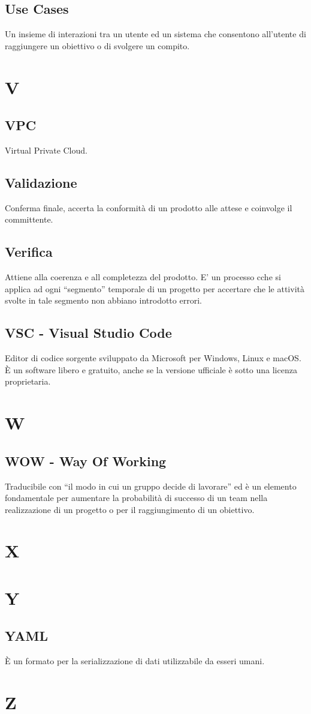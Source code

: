 \documentclass{classes/base}
\begin{document}
        \subsection*{Use Cases} 
        Un insieme di interazioni tra un utente ed un sistema che consentono all'utente di raggiungere un obiettivo o di svolgere un compito.
        
        \newpage  
    \section{V}

        \subsection*{VPC}
        Virtual Private Cloud.

        \subsection*{Validazione} 
        Conferma finale, accerta la conformità di un prodotto alle attese e coinvolge il committente.

        \subsection*{Verifica}
        Attiene alla coerenza e all completezza del prodotto. E’ un processo cche si applica ad ogni “segmento” temporale di un progetto per accertare che le attività svolte in tale segmento non abbiano introdotto errori.

        \subsection*{VSC - Visual Studio Code}
        Editor di codice sorgente sviluppato da Microsoft per Windows, Linux e macOS. È un software libero e gratuito, anche se la versione ufficiale è sotto una licenza proprietaria.

        \newpage  
    \section{W}
        \subsection*{WOW - Way Of Working}
        Traducibile con “il modo in cui un gruppo decide di lavorare” ed è un elemento fondamentale per aumentare la probabilità di successo di un team nella realizzazione di un progetto o per il raggiungimento di un obiettivo.  
        \newpage  
    \section{X}
    \newpage  
    \section{Y}
        \subsection*{YAML}
        È un formato per la serializzazione di dati utilizzabile da esseri umani.
        
        \newpage  
    \section{Z}
\end{document}
